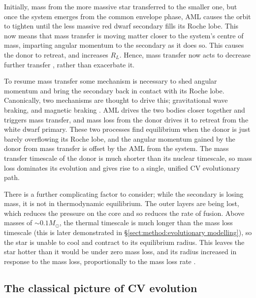 Initially, mass from the more massive star transferred to the smaller one, but once the system emerges from the common envelope phase, AML causes the orbit to tighten until the less massive red dwarf secondary fills its Roche lobe. This now means that mass transfer is moving matter closer to the system's centre of mass, imparting angular momentum to the secondary as it does so. This causes the donor to retreat, and increases $R_L$. Hence, mass transfer now acts to decrease further transfer \citep{Ritter2008}, rather than exacerbate it.

To resume mass transfer some mechanism is necessary to shed angular momentum and bring the secondary back in contact with its Roche lobe. 
Canonically, two mechanisms are thought to drive this; gravitational wave braking, and magnetic braking \citep{knigge2006,knigge11}.
AML drives the two bodies closer together and triggers mass transfer, and mass loss from the donor drives it to retreat from the white dwarf primary. These two processes find equilibrium when the donor is just barely overflowing its Roche lobe, and the angular momentum gained by the donor from mass transfer is offset by the AML from the system.
The mass transfer timescale of the donor is much shorter than its nuclear timescale, so mass loss dominates its evolution and gives rise to a single, unified CV evolutionary path.

There is a further complicating factor to consider; while the secondary is losing mass, it is not in thermodynamic equilibrium. The outer layers are being lost, which reduces the pressure on the core and so reduces the rate of fusion. 
Above masses of $\sim 0.1 M_\odot$, the thermal timescale is much longer than the mass loss timescale (this is later demonstrated in \S\ref{sect:method:evolutionary modelling}), so the star is unable to cool and contract to its equilibrium radius. This leaves the star hotter than it would be under zero mass loss, and its radius increased in response to the mass loss, proportionally to the mass loss rate \citep{knigge2006, knigge11}.


\subsection{The classical picture of CV evolution}
\label{sect:introduction:AMLMechs}

